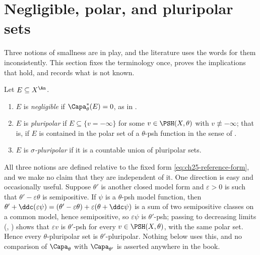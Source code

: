 \section{Negligible, polar, and pluripolar sets}
\label{sec:ch25-negligible}

Three notions of smallness are in play, and the literature uses the words
for them inconsistently.  This section fixes the terminology once, proves the
implications that hold, and records what is not known.

\begin{definition}
\label{def:ch25-set-classes}
Let $E\subseteq X^{\An}$.
\begin{enumerate}
\item\label{itm:ch25-cls:neg}
 $E$ is \emph{negligible} if $\Capa^*_\theta(E)=0$, as in
 .
\item\label{itm:ch25-cls:plp}
 $E$ is \emph{pluripolar} if $E\subseteq\{v=-\infty\}$ for some
 $v\in\PSH(X,\theta)$ with $v\not\equiv-\infty$; that is, if $E$ is
 contained in the polar set of a $\theta$-psh function in the sense of
 .
\item\label{itm:ch25-cls:sig}
 $E$ is \emph{$\sigma$-pluripolar} if it is a countable union of
 pluripolar sets.
\end{enumerate}
\end{definition}

\begin{remark}
\label{rem:ch25-independence-of-theta}
All three notions are defined relative to the fixed form
\eqref{eq:ch25-reference-form}, and we make no claim that they are
independent of it.  One direction is easy and occasionally useful.  Suppose
$\theta'$ is another closed model form and $\varepsilon>0$ is such that
$\theta'-\varepsilon\theta$ is semipositive.  If $\psi$ is a
$\theta$-psh model function, then
$\theta'+\ddc(\varepsilon\psi)
 =(\theta'-\varepsilon\theta)+\varepsilon(\theta+\ddc\psi)$
is a sum of two semipositive classes on a common model, hence semipositive,
so $\varepsilon\psi$ is $\theta'$-psh; passing to decreasing limits
(,
) shows that $\varepsilon v$ is
$\theta'$-psh for every $v\in\PSH(X,\theta)$, with the same polar set.
Hence every $\theta$-pluripolar set is $\theta'$-pluripolar.  Nothing
below uses this, and no comparison of $\Capa_\theta$ with
$\Capa_{\theta'}$ is asserted anywhere in the book.
\end{remark}

